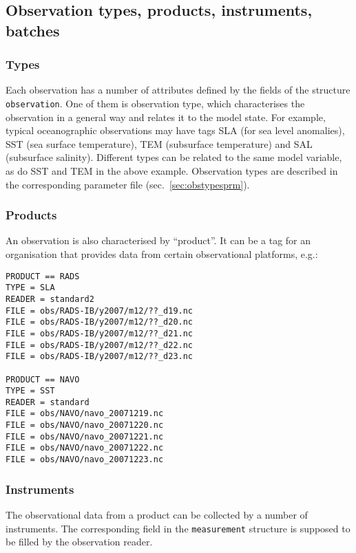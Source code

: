 \documentclass[11pt]{report}
\begin{document}
\subsection{Observation types, products, instruments, batches}

\subsubsection{Types}
\label{sec:types}

Each observation has a number of attributes defined by the fields of the structure \verb|observation|.
One of them is observation type, which characterises the observation in a general way and relates it to the model state.
For example, typical oceanographic observations may have tags SLA (for sea level anomalies), SST (sea surface temperature), TEM (subsurface temperature) and SAL (subsurface salinity).
Different types can be related to the same model variable, as do SST and TEM in the above example.
Observation types are described in the corresponding parameter file (sec.~\ref{sec:obstypesprm}).

\subsubsection{Products}

An observation is also characterised by ``product''.
It can be a tag for an organisation that provides data from certain observational platforms, e.g.:
\begin{Verbatim}[frame=single,fontsize=\footnotesize]
PRODUCT == RADS
TYPE = SLA
READER = standard2
FILE = obs/RADS-IB/y2007/m12/??_d19.nc
FILE = obs/RADS-IB/y2007/m12/??_d20.nc
FILE = obs/RADS-IB/y2007/m12/??_d21.nc
FILE = obs/RADS-IB/y2007/m12/??_d22.nc
FILE = obs/RADS-IB/y2007/m12/??_d23.nc

PRODUCT == NAVO
TYPE = SST
READER = standard
FILE = obs/NAVO/navo_20071219.nc
FILE = obs/NAVO/navo_20071220.nc
FILE = obs/NAVO/navo_20071221.nc
FILE = obs/NAVO/navo_20071222.nc
FILE = obs/NAVO/navo_20071223.nc
\end{Verbatim}

\subsubsection{Instruments}

The observational data from a product can be collected by a number of instruments.
The corresponding field in the \verb|measurement| structure is supposed to be filled by the observation reader.
\end{document}

